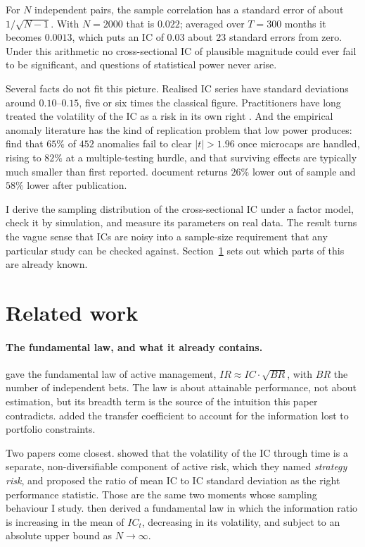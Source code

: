 \documentclass[11pt,a4paper]{article}
\begin{document}
For $N$ independent pairs, the sample correlation has a standard error of about
$1/\sqrt{N-1}$. With $N = 2000$ that
is $0.022$; averaged over $T = 300$ months it becomes $0.0013$, which puts an IC of
$0.03$ about $23$ standard errors from zero. Under this arithmetic no cross-sectional IC of
plausible magnitude could ever fail to be significant, and questions of statistical power
never arise.

Several facts do not fit this picture. Realised IC series have standard deviations
around $0.10$--$0.15$, five or six times the classical figure. Practitioners have long
treated the volatility of the IC as a risk in its own right \citep{qian2004active}. And
the empirical anomaly literature has the kind of replication problem that low power
produces: \citet{hou2020replicating} find
that $65\%$ of $452$ anomalies fail to clear $|t| > 1.96$ once microcaps are handled,
rising to $82\%$ at a multiple-testing hurdle, and that surviving effects are typically
much smaller than first reported. \citet{mclean2016academic} document returns $26\%$
lower out of sample and $58\%$ lower after publication.

I derive the sampling distribution of the
cross-sectional IC under a factor model, check it by simulation, and measure its
parameters on real data. The result turns the vague sense that ICs are noisy into a
sample-size requirement that any particular study can be checked against.
Section~\ref{sec:related} sets out which parts of this are already known.

\section{Related work}\label{sec:related}

\paragraph{The fundamental law, and what it already contains.}
\citet{grinold1989law} gave the fundamental law of active management,
$IR \approx IC \cdot \sqrt{BR}$, with $BR$ the number of independent bets. The law is
about attainable performance, not about estimation, but its breadth term is the source
of the intuition this paper contradicts. \citet{clarke2002constraints} added the transfer
coefficient to account for the information lost to portfolio constraints.

Two papers come closest. \citet{qian2004active} showed that the volatility of the IC
through time is a separate, non-diversifiable component of active risk, which they
named \emph{strategy risk}, and proposed the ratio of mean IC to IC standard deviation
as the right performance statistic. Those are the same two moments whose sampling
behaviour I study. \citet{ding2017redux} then derived a fundamental law in which the information
ratio is increasing in the mean of $IC_t$, decreasing in its volatility, and subject to
an absolute upper bound as $N \to \infty$.
\end{document}

